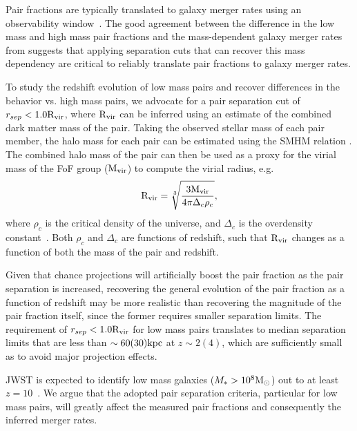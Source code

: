 \documentclass[twocolumn]{aastex631}
\newcommand{\Rvir}{\ensuremath{\rm R_{vir}}}
\begin{document}
    Pair fractions are typically translated to galaxy merger rates using an observability window~\citep{lotz11}.
    The good agreement between the difference in the low mass and high mass pair fractions and the mass-dependent galaxy merger rates from \cite{rg15} suggests that applying separation cuts that can recover this mass dependency are critical to reliably translate pair fractions to galaxy merger rates. 

    To study the redshift evolution of low mass pairs and recover differences in the behavior vs. high mass pairs, we advocate for a pair separation cut of  $r_{sep} < 1.0\Rvir$, where $\Rvir$ can be inferred using an estimate of the combined dark matter mass of the pair.
    Taking the observed stellar mass of each pair member, the halo mass for each pair can be estimated using the SMHM relation \citep[e.g.,][]{Moster2013}. 
    The combined halo mass of the pair can then be used as a proxy for the virial mass of the FoF group ($\rm M_{vir}$) to compute the virial radius, e.g. 
    \begin{equation}
    \Rvir = \sqrt[3]{\frac{3\rm M_{vir}}{4\pi \Delta_{c}\rho_{c}}},
    \end{equation}
    where $\rho_c$ is the critical density of the universe, and $\Delta_{c}$ is the overdensity constant~\citep[see][]{BinneyTremaine}. 
    Both $\rho_c$ and $\Delta_{c}$ are functions of redshift, such that $\Rvir$ changes as a function of both the mass of the pair and redshift.
    
    Given that chance projections will artificially boost the pair fraction as the pair separation is increased, recovering the general evolution of the pair fraction as a function of redshift may be more realistic than recovering the magnitude of the pair fraction itself, since the former requires smaller separation limits. 
    The requirement of $r_{sep} < 1.0\Rvir$ for low mass pairs translates to median separation limits that are less than $\sim 60(30)\mathrm{kpc}$ at $z \sim2(4)$, which are sufficiently small as to avoid major projection effects. 

    JWST is expected to identify low mass galaxies ($M_* > 10^8\mathrm{M}_\odot$) out to at least $z=10$~\citep{Behroozi2020}. 
    We argue that the adopted pair separation criteria, particular for low mass pairs, will greatly affect the measured pair fractions and consequently the inferred merger rates. 
\end{document}

